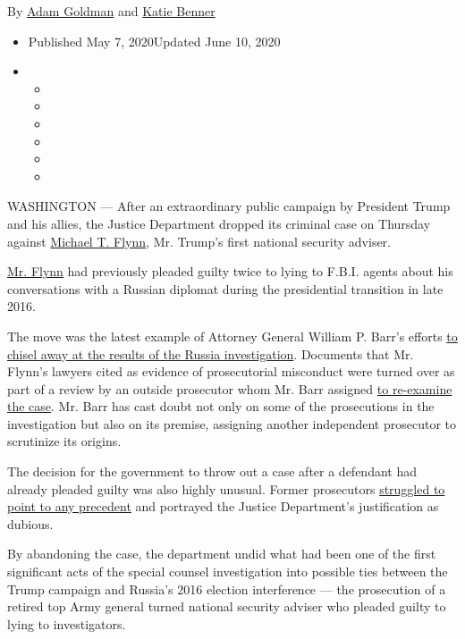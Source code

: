 By \href{https://www.nytimes.com/by/adam-goldman}{Adam Goldman} and
\href{https://www.nytimes.com/by/katie-benner}{Katie Benner}

\begin{itemize}
\item
  Published May 7, 2020Updated June 10, 2020
\item
  \begin{itemize}
  \item
  \item
  \item
  \item
  \item
  \item
  \end{itemize}
\end{itemize}

WASHINGTON --- After an extraordinary public campaign by President Trump
and his allies, the Justice Department dropped its criminal case on
Thursday against
\href{https://www.nytimes.com/2020/05/07/us/politics/michael-flynn-case.html}{Michael
T. Flynn}, Mr. Trump's first national security adviser.

\href{https://www.nytimes.com/2020/05/07/us/politics/michael-flynn-case.html}{Mr.
Flynn} had previously pleaded guilty twice to lying to F.B.I. agents
about his conversations with a Russian diplomat during the presidential
transition in late 2016.

The move was the latest example of Attorney General William P. Barr's
efforts
\href{https://www.nytimes.com/2020/03/06/us/barr-mueller-investigation.html}{to
chisel away at the results of the Russia investigation}. Documents that
Mr. Flynn's lawyers cited as evidence of prosecutorial misconduct were
turned over as part of a review by an outside prosecutor whom Mr. Barr
assigned
\href{https://www.nytimes.com/2020/02/14/us/politics/michael-flynn-prosecutors-barr.html}{to
re-examine the case}. Mr. Barr has cast doubt not only on some of the
prosecutions in the investigation but also on its premise, assigning
another independent prosecutor to scrutinize its origins.

The decision for the government to throw out a case after a defendant
had already pleaded guilty was also highly unusual. Former prosecutors
\href{https://www.nytimes.com/2020/05/07/us/politics/michael-flynn-case.html}{struggled
to point to any precedent} and portrayed the Justice Department's
justification as dubious.

By abandoning the case, the department undid what had been one of the
first significant acts of the special counsel investigation into
possible ties between the Trump campaign and Russia's 2016 election
interference --- the prosecution of a retired top Army general turned
national security adviser who pleaded guilty to lying to investigators.

